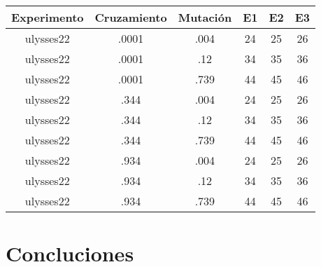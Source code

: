 \documentclass[letterpaper,11pt]{article}
\begin{document}
\newline
\newline
\begin{tabular}{|c|c|c|c|c|c|}
\hline
	\textbf{Experimento} & \textbf{Cruzamiento} & \textbf{Mutaci\'on} & \textbf{E1} & \textbf{E2} & \textbf{E3}\\
\hline
	ulysses22 & .0001 & .004 & 24 & 25 & 26\\
\hline
	ulysses22 & .0001 & .12 & 34 & 35 & 36\\
\hline
	ulysses22 & .0001 & .739 & 44 & 45 & 46\\
\hline
	ulysses22 & .344 & .004 & 24 & 25 & 26\\
\hline
	ulysses22 & .344 & .12 & 34 & 35 & 36\\
\hline
	ulysses22 & .344 & .739 & 44 & 45 & 46\\
\hline
	ulysses22 & .934 & .004 & 24 & 25 & 26\\
\hline
	ulysses22 & .934 & .12 & 34 & 35 & 36\\
\hline
	ulysses22 & .934 & .739 & 44 & 45 & 46\\
\hline
\end{tabular}


 \section*{Concluciones}
 
\end{document}
